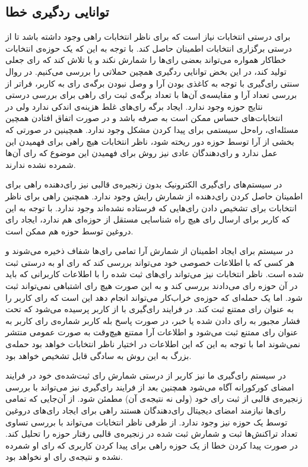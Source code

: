 \subsection{توانایی ردگیری خطا}
برای درستی انتخابات نیاز است که برای ناظر انتخابات راهی وجود داشته باشد تا از درستی برگزاری انتخابات اطمینان حاصل کند. با توجه به این که یک حوزه‌ی انتخابات خطاکار همواره می‌تواند بعضی رای‌ها را شمارش نکند و یا تلاش کند که رای جعلی تولید کند، در این بخض توانایی ردگیری همچین حملاتی را بررسی می‌کنیم.
در روال سنتی رای‌گیری با توجه به کاغذی بودن آرا و وصل نبودن برگه‌ی رای به کاربر، فراتر از بررسی تعداد آرا و مقایسه‌ی آن‌ها با تعداد برگه‌ی ثبت رای راهی برای بررسی درستی نتایج حوزه وجود ندارد. ایجاد برگه‌ رای‌های غلط هزینه‌ی اندکی ندارد ولی در انتخابات‌های حساس ممکن است به صرفه باشد و در صورت اتفاق افتادن همچین مسئله‌ای، راه‌حل سیستمی برای پیدا کردن مشکل وجود ندارد. همچینین در صورتی که بخشی از آرا توسط حوزه دور ریخته شود، ناظر انتخابات هیچ راهی برای فهمیدن این عمل ندارد و رای‌دهندگان عادی نیز روش برای فهمیدن این موضوع که رای آن‌ها شمرده نشده ندارند.
\par 
در سیستم‌های رای‌گیری الکترونیک بدون زنجیره‌ی قالبی نیز رای‌دهنده راهی برای اطمینان حاصل کردن رای‌‌دهنده از شمارش رایش وجود ندارد. همچنین راهی برای ناظر انتخابات برای تشخیص دادن رای‌هایی که فرستاده نشده‌اند وجود ندارد. با توجه به این که کاربر برای ارسال رای هیچ راه شناسایی مستقل از حوزه‌ای هم ندارد، ایجاد رای دروغین توسط حوزه هم ممکن است. 
\par 
در سیستم‌  برای ایجاد اطمینان از شمارش آرا تمامی رای‌ها شفاف ذخیره می‌شوند و هر کسی که با اطلاعات خصوصی خود می‌تواند بررسی کند که رای او به درستی ثبت شده است. ناظر انتخابات نیز می‌تواند رای‌های ثبت شده را با اطلاعات کاربرانی که باید در آن حوزه رای می‌دادند بررسی کند و به این صورت هیچ رای اشتباهی نمی‌تواند ثبت شود. اما یک حمله‌ای که حوزه‌ی خراب‌کار می‌تواند انجام دهد این است که رای کاربر را به عنوان رای ممتنع ثبت کند. در فرایند رای‌گیری با  از کاربر پرسیده می‌شود که تحت فشار مجبور به رای دادن شده یا خبر، در صورت پاسخ بله کاربر شماره‌ی رای کاربر به عنوان رای ممتنع ثبت می‌شود و اطلاعات آرا ممتنع هیچ‌وقت به صورت عمومی منتشر نمی‌شوند اما با توجه به این که این اطلاعات در اختیار ناظر انتخابات خواهد بود حمله‌‌ی بزرگ به این روش به سادگی قابل تشخیص خواهد بود. 
\par 
در سیستم رای‌گیری ما نیز کاربر از درستی شمارش رای‌ ثبت‌شده‌ی خود در فرایند امضای کورکورانه آگاه می‌شود همچنین بعد از فرایند رای‌گیری نیز می‌تواند با بررسی زنجیره‌ی قالبی از ثبت رای‌ خود (ولی نه نتیجه‌ی آن) مطمئن شود. از آن‌جایی که تمامی رای‌ها نیازمند امضای دیجیتال رای‌دهندگان هستند راهی برای ایجاد رای‌های دروغین توسط یک حوزه نیز وجود ندارد. از طرفی ناظر انتخابات می‌تواند با بررسی تساوی تعداد تراکنش‌ها ثبت و شمارش ثبت شده در زنجیره‌ی قالبی رفتار حوزه را تحلیل کند. در صورت پیدا کردن خطا از یک حوزه راهی برای پیدا کردن کاربری که رای او شمرده نشده و نتیجه‌ی رای او نخواهد بود. 



